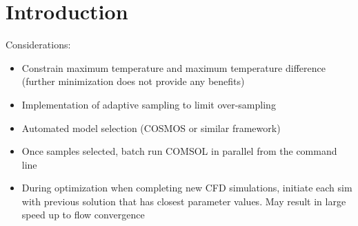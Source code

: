 \documentclass[12pt]{article}
\begin{document}

\section{Introduction}
\label{sec:intro}
Considerations: 
\begin{itemize}
	\item Constrain maximum temperature and maximum temperature difference (further minimization does not provide any benefits)
	\item Implementation of adaptive sampling to limit over-sampling
	\item Automated model selection (COSMOS or similar framework)
	\item Once samples selected, batch run COMSOL in parallel from the command line
	\item During optimization when completing new CFD simulations, initiate each sim with previous solution that has closest parameter values. May result in large speed up to flow convergence
\end{itemize}

\clearpage
\begin{multicols}{2}
	\begin{scriptsize}
		\begin{singlespace}
			
			
		\end{singlespace}
	\end{scriptsize}
\end{multicols}
%	
	
\end{document}
